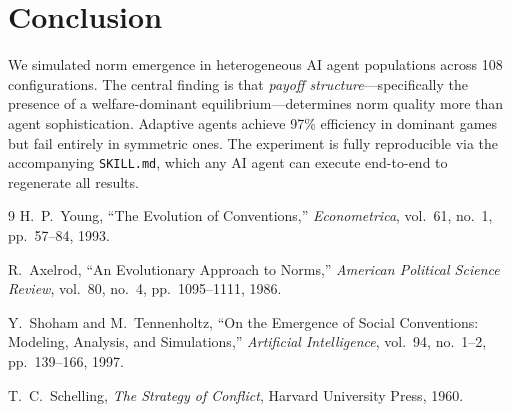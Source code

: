 \documentclass[11pt]{article}
\begin{document}
\section{Conclusion}

We simulated norm emergence in heterogeneous AI agent populations across 108 configurations.
The central finding is that \emph{payoff structure}---specifically the presence of a welfare-dominant equilibrium---determines norm quality more than agent sophistication.
Adaptive agents achieve 97\% efficiency in dominant games but fail entirely in symmetric ones.
The experiment is fully reproducible via the accompanying \texttt{SKILL.md}, which any AI agent can execute end-to-end to regenerate all results.

\begin{thebibliography}{9}
H.~P.~Young,
``The Evolution of Conventions,''
\emph{Econometrica}, vol.~61, no.~1, pp.~57--84, 1993.

R.~Axelrod,
``An Evolutionary Approach to Norms,''
\emph{American Political Science Review}, vol.~80, no.~4, pp.~1095--1111, 1986.

Y.~Shoham and M.~Tennenholtz,
``On the Emergence of Social Conventions: Modeling, Analysis, and Simulations,''
\emph{Artificial Intelligence}, vol.~94, no.~1--2, pp.~139--166, 1997.

T.~C.~Schelling,
\emph{The Strategy of Conflict},
Harvard University Press, 1960.
\end{thebibliography}
\end{document}

